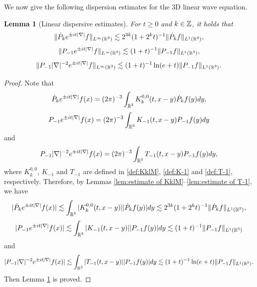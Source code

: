 \documentclass[11pt,twoside]{article}
\def\Z{\mathop{\mathbb Z\kern 0pt}\nolimits}
\def\R{\mathop{\mathbb R\kern 0pt}\nolimits}
\def\ls{\lesssim}
\newcommand{\pk}{\dot{P}_k}
\theoremstyle{plain}
\newtheorem{lemma}[theorem]{Lemma}
\theoremstyle{definition}
\numberwithin{equation}{section}
\begin{document}
	We now give the following dispersion estimates for the 3D linear wave equation.
	\begin{lemma}[Linear dispersive estimates]\label{lem:linear dispersive}
		For $t\ge0$ and $k\in \Z$, it holds that
		\begin{equation}\label{ineq:linear dispersive}
			\|\pk e^{\pm it|\nabla|}f\|_{L^\infty(\R^3)} \lesssim 2^{3k}(1+2^kt)^{-1}\|\pk f\|_{L^1(\R^3)},
		\end{equation}
		\begin{equation}\label{ineq:linear dispersive 2}
			\|P_{-1}e^{\pm it|\nabla|}f\|_{L^\infty(\R^3)} \lesssim (1+t)^{-1}\|P_{-1} f\|_{L^1(\R^3)},
		\end{equation}
		\begin{equation}\label{ineq:linear dispersive 3}
			\|P_{-1}|\nabla|^{-2}e^{\pm it|\nabla|}f\|_{L^\infty(\R^3)} \lesssim (1+t)^{-1}\ln(e+t)\|P_{-1} f\|_{L^1(\R^3)}.
		\end{equation}
	\end{lemma}
	\begin{proof}
		Note that
		\begin{equation*}
			\pk e^{\pm it|\nabla|}f(x)=(2\pi)^{-3}\int_{\R^3}K_k^{0,0}(t,x-y) \pk f(y)dy,
		\end{equation*}	
		\begin{equation*}
			P_{-1} e^{\pm it|\nabla|}f(x)=(2\pi)^{-3}\int_{\R^3}K_{-1}(t,x-y) P_{-1} f(y)dy
		\end{equation*}		
		and
		\begin{equation*}
			P_{-1} |\nabla|^{-2}e^{\pm it|\nabla|}f(x)=(2\pi)^{-3}\int_{\R^3}T_{-1}(t,x-y) P_{-1} f(y)dy,
		\end{equation*}		
		where $K^{0,0}_k$, $K_{-1}$ and  $T_{-1}$ are defined in \eqref{def:KklM}, \eqref{def:K-1} and \eqref{def:T-1}, respectively.
		Therefore, by Lemmas \ref{lem:estimate of KklM}--\ref{lem:estimate of T-1}, we have
		\begin{equation*}
			|\pk e^{\pm it|\nabla|}f(x)|
			\ls\int_{\R^3}|K_k^{0,0}(t,x-y)||\pk f(y)|dy
			\lesssim 2^{3k}(1+2^kt)^{-1}\|\pk f\|_{L^1(\R^3)},
		\end{equation*}
		\begin{equation*}
			|P_{-1}e^{\pm it|\nabla|}f(x)|
			\ls\int_{\R^3}|K_{-1}(t,x-y)||P_{-1}f(y)|dy
			\lesssim (1+t)^{-1}\|P_{-1} f\|_{L^1(\R^3)}
		\end{equation*}
		and
		\begin{equation*}
			|P_{-1}|\nabla|^{-2}e^{\pm it|\nabla|}f(x)|
			\ls\int_{\R^3}|T_{-1}(t,x-y)||P_{-1}f(y)|dy
			\lesssim (1+t)^{-1}\ln(e+t)\|P_{-1} f\|_{L^1(\R^3)}.
		\end{equation*}
		Then Lemma \ref{lem:linear dispersive} is proved.
	\end{proof}
\end{document}
